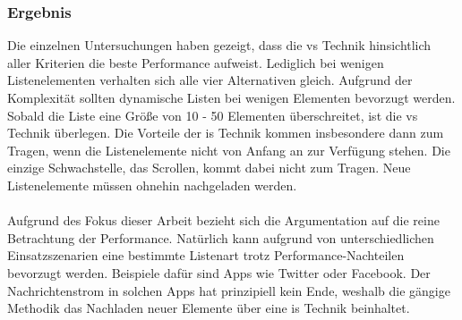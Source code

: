 \subsubsection{Ergebnis}
Die einzelnen Untersuchungen haben gezeigt, dass die \gls{vs} Technik hinsichtlich aller Kriterien die beste Performance aufweist. Lediglich bei wenigen Listenelementen verhalten sich alle vier Alternativen gleich. Aufgrund der Komplexität sollten dynamische Listen bei wenigen Elementen bevorzugt werden. Sobald die Liste eine Größe von 10 - 50 Elementen überschreitet, ist die \gls{vs} Technik überlegen. Die Vorteile der \gls{is} Technik kommen insbesondere dann zum Tragen, wenn die Listenelemente nicht von Anfang an zur Verfügung stehen. Die einzige Schwachstelle, das Scrollen, kommt dabei nicht zum Tragen. Neue Listenelemente müssen ohnehin nachgeladen werden. 
\\\\
Aufgrund des Fokus dieser Arbeit bezieht sich die Argumentation auf die reine Betrachtung der Performance. Natürlich kann aufgrund von unterschiedlichen Einsatzszenarien eine bestimmte Listenart trotz Performance-Nachteilen bevorzugt werden. Beispiele dafür sind Apps wie Twitter oder Facebook. Der Nachrichtenstrom in solchen Apps hat prinzipiell kein Ende, weshalb die gängige Methodik das Nachladen neuer Elemente über eine \gls{is} Technik beinhaltet.
